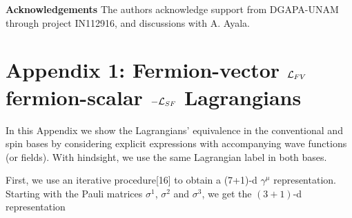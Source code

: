 \documentclass[12pt]{article}
\renewcommand\[{\begin{dmath}}
\renewcommand\]{\end{dmath}}
\begin{document}
\begin{thebibliography}{99}










\end{thebibliography}

{\bf Acknowledgements}
 The
authors acknowledge  support from  DGAPA-UNAM through project IN112916, and discussions with A. Ayala.


\appendix{}
\section*{Appendix 1: Fermion-vector   ${\cal L}_{FV}$ fermion-scalar $-{\cal L}_{SF}$ Lagrangians  }



In this  Appendix we    show  the  Lagrangians'   equivalence    in the conventional and spin  bases by considering  explicit   expressions with accompanying wave functions (or fields).
With hindsight, we use the same   Lagrangian   label in both bases.

First, we use an iterative procedure[16] to obtain a (7+1)-d  $\gamma^\mu$ representation.
Starting with the Pauli matrices $\sigma^{1}$, $\sigma^{2}$ and
$\sigma^{3}$, we get the $(3+1)$-d representation
\end{document}

